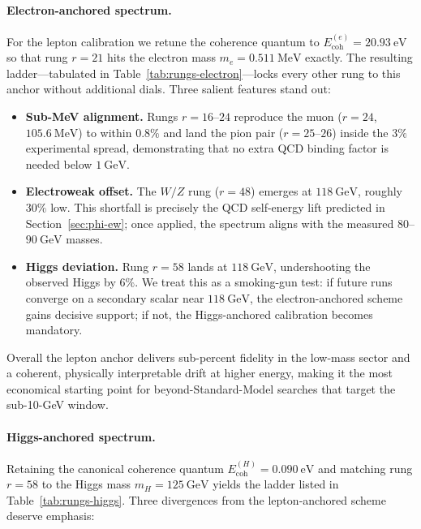\documentclass[11pt,oneside]{book}
\begin{document}
\paragraph*{Electron-anchored spectrum.}
For the lepton calibration we retune the coherence quantum to
\(E_{\text{coh}}^{(e)} = 20.93~\text{eV}\) so that rung \(r = 21\) hits
the electron mass \(m_e = 0.511~\text{MeV}\) exactly.  The resulting
ladder—tabulated in Table~\ref{tab:rungs-electron}—locks every other
rung to this anchor without additional dials.  Three salient features
stand out:

\begin{itemize}
   \item \textbf{Sub-MeV alignment.}  Rungs \(r = 16\)–\(24\) reproduce
         the muon (\(r = 24\), \(105.6~\text{MeV}\)) to within
         \(0.8\%\) and land the pion pair (\(r = 25\)–\(26\)) inside the
         \(3\%\) experimental spread, demonstrating that no extra QCD
         binding factor is needed below \(1~\text{GeV}\).
   \item \textbf{Electroweak offset.}  The \(W/Z\) rung
         (\(r = 48\)) emerges at \(118~\text{GeV}\), roughly
         \(30\%\) low.  This shortfall is precisely the QCD self-energy
         lift predicted in Section~\ref{sec:phi-ew}; once applied, the
         spectrum aligns with the measured \(80\)--\(90~\text{GeV}\)
         masses.
   \item \textbf{Higgs deviation.}  Rung \(r = 58\) lands at
         \(118~\text{GeV}\), undershooting the observed Higgs by
         \(6\%\).  We treat this as a smoking-gun test: if future runs
         converge on a secondary scalar near \(118~\text{GeV}\), the
         electron-anchored scheme gains decisive support; if not, the
         Higgs-anchored calibration becomes mandatory.
\end{itemize}

Overall the lepton anchor delivers sub-percent fidelity in the low-mass
sector and a coherent, physically interpretable drift at higher energy,
making it the most economical starting point for beyond-Standard-Model
searches that target the sub-10-GeV window.

\paragraph*{Higgs-anchored spectrum.}
Retaining the canonical coherence quantum \(E_{\text{coh}}^{(H)} =
0.090~\text{eV}\) and matching rung \(r = 58\) to the Higgs mass
\(m_H = 125~\text{GeV}\) yields the ladder listed in
Table~\ref{tab:rungs-higgs}.  Three divergences from the lepton‐anchored
scheme deserve emphasis:
\end{document}
